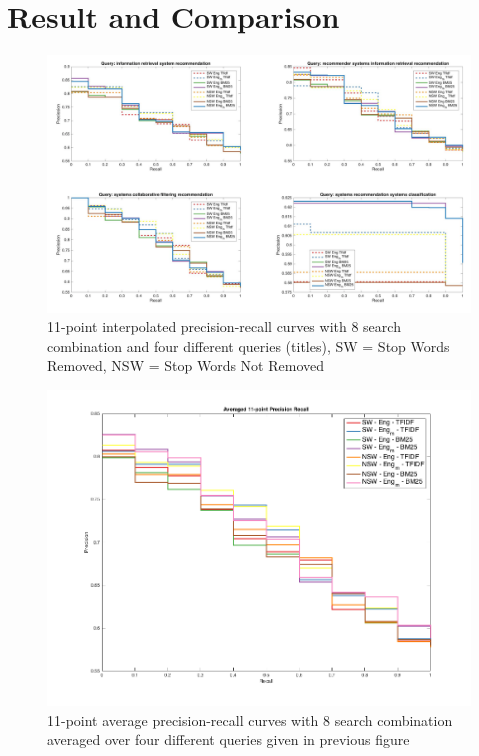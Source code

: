 \documentclass[report,draft*]{aaltoseries}
\begin{document}
\section{Result and Comparison}
\begin{figure}[ht!]
\centering
\includegraphics[width=\textwidth]{11PointPrecission.png}
\caption{ 11-point interpolated precision-recall curves with 8 search combination and four different queries (titles), SW = Stop Words Removed, NSW = Stop Words Not Removed}
\label{fig:1_1}
\end{figure} 

\begin{figure}[ht!]
\centering
\includegraphics[width=\textwidth]{avg11point.png}
\caption{ 11-point average precision-recall curves with 8  search combination averaged over four different queries given in previous figure}
\label{fig:1_2}
\end{figure} 
\end{document}
